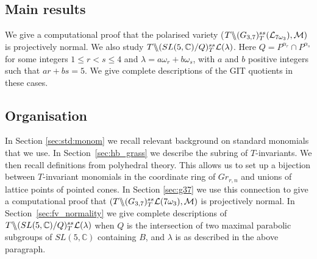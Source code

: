  \subsection{Main results}
We give a computational proof  that the polarised variety ($T \backslash\mkern-6mu\backslash (G_{{3},{7}})^{ss}_T{({\cal L}_{7\omega_3})}, {\cal M})$ is projectively normal.  
We also study $T\backslash\mkern-6mu\backslash(SL(5, \mathbb{C})/Q)^{ss}_{T} {\mathcal L}(\lambda)$. Here $Q=P^{\alpha_{r}}\cap P^{\alpha_{s}}$ for some integers $1\leq r < s \leq 4$ and $\lambda=a\omega_r+b\omega_s$, with $a$ and $b$ positive integers such that $ar+bs=5$. 
We give complete descriptions of the GIT quotients in these cases.

\subsection{Organisation}
In Section \ref{sec:std:monom} we recall relevant background on standard monomials that we use.
In Section~\ref{sec:hb_grass} we describe the subring of $T$-invariants. We then recall definitions from polyhedral theory. This allows us to set up a bijection between $T$-invariant monomials in the coordinate ring of $Gr_{r,n}$ and unions of lattice points of pointed cones. In Section \ref{sec:g37} we use this connection to give a computational proof that $(T \backslash\mkern-6mu\backslash (G_{{3},{7}})^{ss}_T{\cal L}(7\omega_3), {\cal M})$  is projectively normal. In Section~\ref{sec:fv_normality} we give complete descriptions of  $T \backslash\mkern-6mu\backslash (SL(5,{\mathbb C}) / Q)^{ss}_{T}{\cal L}(\lambda)$ when $Q$ is the intersection of two maximal parabolic subgroups of $SL(5,{\mathbb C})$ containing $B$,  and $\lambda$ is as described in the above paragraph.





